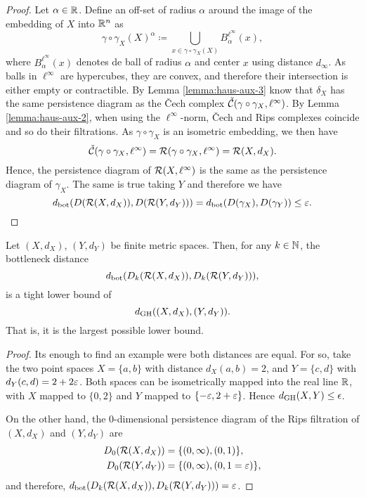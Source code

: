\begin{proof}
    Let $\alpha \in \mathbb R $. Define an off-set of radius $ \alpha $ around the image of the embedding of $ X $ into $ \mathbb R^n $ as
    \begin{equation}
        \gamma \circ \gamma_X(X)^\alpha \coloneq \bigcup_{x \in \gamma \circ \gamma_X(X)} B_\alpha^{\ell^\infty}(x),
    \end{equation}
    where $ B_\alpha^{\ell^\infty}(x) $ denotes de ball of radius $ \alpha $ and center $ x $ using distance $ d_\infty $. As balls in $ \ell^\infty $ are hypercubes, they are convex, and therefore their intersection is either empty or contractible. By Lemma \ref{lemma:haus-aux-3} know that $ \delta_X $ has the same persistence diagram as the Čech complex $ \check{\mathcal{C}}(\gamma \circ \gamma_X, \ell^\infty) $. By Lemma \ref{lemma:haus-aux-2}, when using the $ \ell^\infty $-norm, Čech and Rips complexes coincide and so do their filtrations. As $ \gamma \circ \gamma_X $ is an isometric embedding, we then have
    \begin{equation}
        \check{\mathcal{C}}(\gamma \circ \gamma_X, \ell^\infty) = \mathcal{R}(\gamma \circ \gamma_X, \ell^\infty) = \mathcal{R}(X, d_X).
    \end{equation}
    Hence, the persistence diagram of $ \mathcal{R}(X, \ell^\infty) $ is the same as the persistence diagram of $ \gamma_X $. The same is true taking $ Y $ and therefore we have
    \begin{equation}
        d_{\operatorname{bot}}(D(\mathcal{R}(X, d_X)), D(\mathcal{R}(Y, d_Y))) = d_{\operatorname{bot}}(D(\gamma_X), D(\gamma_Y)) \leq \varepsilon.
    \end{equation}
\end{proof}

\begin{proposition}
    Let $ (X, d_X) $, $ (Y, d_Y) $ be finite metric spaces. Then, for any $ k \in \mathbb N$, the bottleneck distance
    \begin{equation}
        d_{\operatorname{bot}}(D_k(\mathcal{R}(X, d_X)), D_k(\mathcal{R}(Y, d_Y))),
    \end{equation}
    is a tight lower bound of
    \begin{equation}
        d_{\operatorname{GH}}((X, d_X), (Y, d_Y)).
    \end{equation}
    That is, it is the largest possible lower bound.
\end{proposition}
\begin{proof}
    Its enough to find an example were both distances are equal. For so, take the two point spaces $ X = \{a, b\} $ with distance $ d_X(a, b) = 2 $, and $ Y = \{ c, d \} $ with $ d_Y(c, d) = 2 + 2 \varepsilon $. Both spaces can be isometrically mapped into the real line $ \mathbb R $, with $ X $ mapped to $ \{0, 2\} $ and $ Y $ mapped to $ \{ -\varepsilon, 2 + \varepsilon \} $. Hence $ d_{\operatorname{GH}}(X, Y) \leq \epsilon $. 

    On the other hand, the $0$-dimensional persistence diagram of the Rips filtration of $ (X, d_X) $ and $ (Y, d_Y) $ are
    \begin{align}
        D_0(\mathcal{R}(X, d_X)) &= \{ (0, \infty), (0, 1)\}, \\
        D_0(\mathcal{R}(Y, d_Y)) &= \{ (0, \infty), (0, 1 = \varepsilon)\},
    \end{align}
    and therefore, $ d_{\operatorname{bot}}(D_k(\mathcal{R}(X, d_X)), D_k(\mathcal{R}(Y, d_Y))) = \varepsilon $.
\end{proof}

